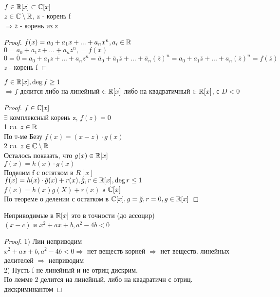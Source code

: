\begin{lemma}
	$ f \in \mathbb{R} [x] \subset \mathbb{C}[x] $ \\
	$ z \in \mathbb{C} \setminus \mathbb{R} $, z - корень f \\
	$ \Rightarrow \bar{z} $ - корень из z \\
	\begin{proof}
		$f(x) =  a_0 + a_1 x + ... + a_n x^n , a_i \in \mathbb{R} $ \\
		$ 0 =  a_0 + a_1 z + ... + a_n z^n , = f(x) $ \\
		$ 0 = \bar{0} = \overline{ a_0 + a_1 z + ... + a_n z^n } =  \bar{a}_0 + \bar{a}_1 \bar{z} + ... + \bar{a}_n (\bar{z})^n =  a_0 + a_1 \bar{z} + ... + a_n (\bar{z})^n  = f(\bar{z}) $ \\
		$ \bar{z} $ - корень f 
	\end{proof}
\end{lemma}
\begin{lemma}
	$ f \in \mathbb{R} [x], \deg f \geq 1 $ \\
	$ \Rightarrow f $ делится либо на линейный $ \in \mathbb{R}[x]$ либо на квадратичный $ \in \mathbb{R}[x] $, с $ D < 0 $ \\
	\begin{proof}
		$ f \in \mathbb{C}[x] $ \\
		$ \exists $ комплексный корень z, $ f(z) = 0 $ \\
		1 сл. $ z \in \mathbb{R} $ \\
		По т-ме Безу $ f(x) = (x-z) \cdot g(x) $\\
		2 сл. $ z \in \mathbb{C} \setminus \mathbb{R} $ \\
		Осталось показать, что $ g(x) \in \mathbb{R}[x] $ \\
		$ f(x) = h(x) \cdot g(x) $ \\
		Поделим f с остатком в $ R[x] $\\
		$ f(x) = h(x) \cdot \tilde{g}(x) + r(x) , \tilde{g}, r \in \mathbb{R}[x], \deg r \leq  1 $ \\
		$ f(x) = h(x) g(X) + r(x) $ в $ \mathbb{C}[x] $\\
		По теореме о делении с остатком в $ \mathbb{C}[x], g = \tilde{g}, r = 0, g \in \mathbb{R}[x] $
	\end{proof}
\end{lemma}
\begin{theorem}
	Неприводимые в $ \mathbb{R}[x] $ это в точности  (до ассоцир) \\
	$ (x - c) $ и $ x^2 + ax + b, a^2 - 4b < 0 $ \\
	\begin{proof}
		1) Лин неприводим \\
		$ x^2 + ax + b, a^2 - 4b < 0 \Rightarrow $ нет веществ корней $ \Rightarrow $ нет веществ. линейных делителей $ \Rightarrow $ неприводим \\
		2) Пусть f не линейный и не отриц дискрим. \\
		По лемме 2 делится на линейный, либо на квадратичн с отриц. дискриминантом 
	\end{proof}
\end{theorem}

